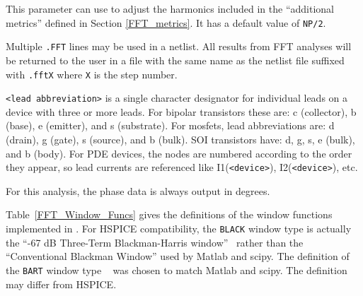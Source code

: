 \begin{Command}
\begin {Arguments}
This parameter can use to adjust the harmonics included in the
``additional metrics'' defined in Section \ref{FFT_metrics}.  It
has a default value of \texttt{NP/2}.

\end{Arguments}

\comments
Multiple \texttt{.FFT} lines may be used in a netlist.  All results from FFT analyses
will be returned to the user in a file with the same name as the netlist file suffixed
with \texttt{.fftX} where {\tt X} is the step number.

\texttt{<lead abbreviation>} is a single character designator for individual
leads on a device with three or more leads.  For bipolar transistors these are:
c (collector), b (base), e (emitter), and s (substrate).  For mosfets, lead
abbreviations are: d (drain), g (gate), s (source), and b (bulk).  SOI
transistors have: d, g, s, e (bulk), and b (body).  For PDE devices, the nodes
are numbered according to the order they appear, so lead currents are
referenced like I1(\texttt{<device>}), I2(\texttt{<device>}), etc.

For this analysis, the phase data is always output in degrees.

\end{Command}

Table~\ref{FFT_Window_Funcs} gives the definitions of the window functions
implemented in \Xyce{}.  For HSPICE compatibility, the {\tt BLACK} window type
is actually the ``-67 dB Three-Term Blackman-Harris window''~\cite{Doerry2017}
rather than the ``Conventional Blackman Window'' used by Matlab and scipy.
The definition of the {\tt BART} window type ~\cite{oppenheimSchafer} was chosen
to match Matlab and scipy.  The \Xyce{} definition may differ from HSPICE.

